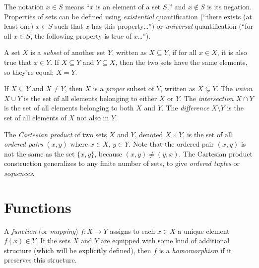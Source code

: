 \documentclass[../generics]{subfiles}
\begin{document}
The notation \index{$\in$}$x\in S$ means ``$x$ is an element of a set $S$,'' and \index{$\notin$}$x\notin S$ is its negation. Properties of sets can be defined using \emph{existential} quantification (``there exists (at least one) $x\in S$ such that $x$ has this property\ldots'') or \emph{universal} quantification (``for all $x\in S$, the following property is true of $x$\ldots'').

%
%
A set $X$ is a \emph{subset} of another set $Y$, written as \index{$\subseteq$}$X\subseteq Y\!$, if for all $x\in X$, it is also true that $x\in Y\!$. If $X\subseteq Y$ and $Y\subseteq X$, then the two sets have the same elements, so they're equal; $X=Y\!$.

If $X\subseteq Y$ and $X\neq Y\!$, then $X$ is a \emph{proper} subset of $Y$, written as \index{$\subsetneq$}$X\subsetneq Y\!$. The \emph{union} \index{$\cup$}$X\cup Y$ is the set of all elements belonging to either $X$ or $Y\!$. The \emph{intersection} \index{$\cap$}$X\cap Y$ is the set of all elements belonging to both $X$ and $Y\!$. The \emph{difference} \index{$\setminus$}$X\setminus Y$ is the set of all elements of $X$ not also in $Y\!$.

The \emph{Cartesian product} of two sets $X$ and $Y\!$, denoted \index{$\times$}$X\times Y\!$, is the set of all \emph{ordered pairs} $(x,y)$ where $x\in X$, $y\in Y\!$. Note that the ordered pair $(x,y)$ is not the same as the set $\{x,y\}$, because $(x,y)\neq(y,x)$. The Cartesian product construction generalizes to any finite number of sets, to give \emph{ordered tuples} or \emph{sequences}.

\section*{Functions}

A \emph{function} (or \emph{mapping}) $f\colon X\rightarrow Y$ assigns to each $x\in X$ a unique element $f(x)\in Y$. If the sets $X$ and $Y$ are equipped with some kind of additional structure (which will be explicitly defined), then $f$ is a \emph{homomorphism} if it preserves this structure.
\end{document}
